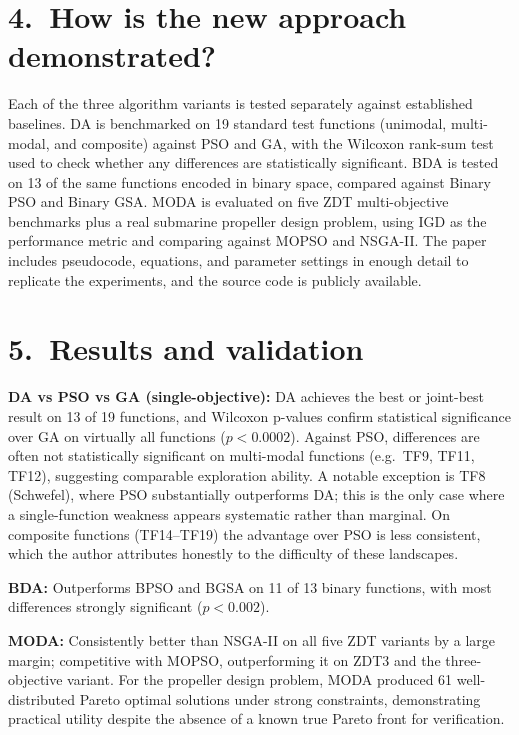 \documentclass[11pt,a4paper]{article}
\begin{document}
\bigskip

\section*{4.\ How is the new approach demonstrated?}

Each of the three algorithm variants is tested separately against established baselines.
DA is benchmarked on 19 standard test functions (unimodal, multi-modal, and composite) against PSO and GA, with the Wilcoxon rank-sum test used to check whether any differences are statistically significant.
BDA is tested on 13 of the same functions encoded in binary space, compared against Binary PSO and Binary GSA.
MODA is evaluated on five ZDT multi-objective benchmarks plus a real submarine propeller design problem, using IGD as the performance metric and comparing against MOPSO and NSGA-II.
The paper includes pseudocode, equations, and parameter settings in enough detail to replicate the experiments, and the source code is publicly available.

\bigskip

\section*{5.\ Results and validation}

\textbf{DA vs PSO vs GA (single-objective):} DA achieves the best or joint-best result on 13 of 19 functions, and Wilcoxon p-values confirm statistical significance over GA on virtually all functions ($p < 0.0002$).
Against PSO, differences are often not statistically significant on multi-modal functions (e.g.\ TF9, TF11, TF12), suggesting comparable exploration ability.
A notable exception is TF8 (Schwefel), where PSO substantially outperforms DA; this is the only case where a single-function weakness appears systematic rather than marginal.
On composite functions (TF14--TF19) the advantage over PSO is less consistent, which the author attributes honestly to the difficulty of these landscapes.

\textbf{BDA:} Outperforms BPSO and BGSA on 11 of 13 binary functions, with most differences strongly significant ($p < 0.002$).

\textbf{MODA:} Consistently better than NSGA-II on all five ZDT variants by a large margin; competitive with MOPSO, outperforming it on ZDT3 and the three-objective variant.
For the propeller design problem, MODA produced 61 well-distributed Pareto optimal solutions under strong constraints, demonstrating practical utility despite the absence of a known true Pareto front for verification.
\end{document}

